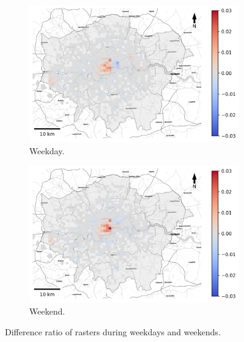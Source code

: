 \documentclass{article}
\theoremstyle{definition}
\theoremstyle{remark}
\begin{document}
\begin{figure}[!h]

\begin{subfigure}{0.5\textwidth}
\includegraphics[width=1\linewidth]{figures/raster_diff_weekday.png} 
\caption{Weekday.}
\label{fig:raster_diff_weekday}
\end{subfigure}
\begin{subfigure}{0.5\textwidth}
\includegraphics[width=1\linewidth]{figures/raster_diff_weekend.png}
\caption{Weekend.}
\label{fig:raster_diff_weekend}
\end{subfigure}

\caption{Difference ratio of rasters during weekdays and weekends.} \label{fig:raster_diff_week}
\end{figure}
\end{document}
